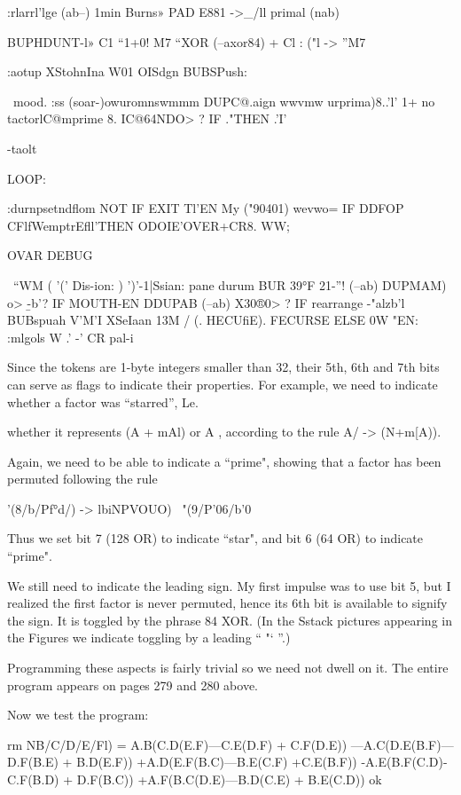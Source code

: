 :rlarrl'lge (ab--)
1min \hltM
Burns» PAD E881 \IMS->_/ll
primal (nab)

BUPHDUNT-l» C1 “1+0! \Mo M7
“XOR (--axor84) + Cl : ("l \M-> ”M7

:aotup XStohnIna
W01
OISdgn
BUBSPush:

\ mood.
:ss (soar-)owuromnswmmm
DUPC@.aign wwvmw urprima)8..'l'
1+ no tactor{lC@mprime} 8.
IC@64NDO> \ptimad?
IF ."THEN .'I'

\bnnm
\inits-taolt
\initdenha
\mpumlmsmssudt

LOOP:

:durnpsetndﬂom NOT IF EXIT Tl'EN
My ("90401)
wevwo= \sutnekunpm
IF DDFOP CFlfWemptrEﬂl’THEN
ODOIE'OVER+CR8. WW;

OVAR DEBUG

\ “WM
( '(' Dis-ion:
) ')'-1|Ssian:
pane durum
BUR 39°F 21-”! (--ab)
DUPMAM) o> \b-b'?
IF MOUTH-EN
DDUPAB (--ab) \etnput
X30®0> \mora?
IF rearrange \M-"alzb'l
BUBspuah V'M'I
XSeIaan 13M \a/
(. HECUﬁE).
FECURSE
ELSE 0W "EN:
:mlgols \Inpuls
W
.' -' CR \hrbaalay
pal-i

Since the tokens are 1-byte integers smaller than 32, their 5th, 6th
and 7th bits can serve as flags to indicate their properties. For
example, we need to indicate whether a factor was “starred”, Le.

whether it represents (A + mAl) or A , according to the rule
\‘A/ -> (N+m[A)).

Again, we need to be able to indicate a “prime", showing that a
factor has been permuted following the rule

\TI’(8/b/Pf°d/) -> lbiNPVOUO) ~"(9/P'06/b'0

Thus we set bit 7 (128 OR) to indicate “star", and bit 6 (64 OR)
to indicate “prime".

We still need to indicate the leading sign. My first impulse was to
use bit 5, but I realized the first factor is never permuted, hence
its 6th bit is available to signify the sign. It is toggled by the phrase
84 XOR. (In the Sstack pictures appearing in the Figures we
indicate toggling by a leading “ "‘ ”.)

Programming these aspects is fairly trivial so we need not dwell
on it. The entire program appears on pages 279 and 280 above.

Now we test the program:

rm NB/C/D/E/Fl) =
A.B(C.D(E.F)—C.E(D.F) + C.F(D.E))
—A.C(D.E(B.F)—D.F(B.E) + B.D(E.F))
+A.D(E.F(B.C)—B.E(C.F) +C.E(B.F))
-A.E(B.F(C.D)-C.F(B.D) + D.F(B.C))
+A.F(B.C(D.E)—B.D(C.E) + B.E(C.D)) ok


